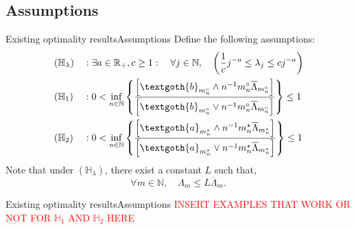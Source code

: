 \documentclass[10pt]{beamer}
\begin{document}
\subsection{Assumptions}
\begin{frame}{Existing optimality results}{Assumptions}
Define the following assumptions:
\begin{alignat*}{2}
&\left(\mathbb{H}_{\lambda}\right) &&: \exists a \in \mathbb{R}_{+}, c \geq 1 : \quad \forall j \in \mathbb{N}, \quad \left(\frac{1}{c} j^{-a} \leq \lambda_{j} \leq c j^{-a}\right)\\
&\left(\mathbb{H}_{1}\right) &&: 0 <\inf\limits_{n \in \mathbb{N}} \left\{\frac{\left[\textgoth{b}_{m_{n}^{\circ}}\wedge n^{-1} m_{n}^{\circ} \overline{\Lambda}_{m_{n}^{\circ}}\right]}{\left[\textgoth{b}_{m_{n}^{\circ}}\vee n^{-1} m_{n}^{\circ} \overline{\Lambda}_{m_{n}^{\circ}}\right]}\right\} \leq 1\\
&\left(\mathbb{H}_{2}\right) &&: 0 <\inf\limits_{n \in \mathbb{N}} \left\{\frac{\left[\textgoth{a}_{m_{n}^{\star}}\wedge n^{-1} m_{n}^{\star} \overline{\Lambda}_{m_{n}^{\star}}\right]}{\left[\textgoth{a}_{m_{n}^{\star}}\vee n^{-1} m_{n}^{\star} \overline{\Lambda}_{m_{n}^{\star}}\right]}\right\} \leq 1\\
\end{alignat*}
Note that under $\left(\mathbb{H}_{\lambda}\right)$, there exist a constant $L$ such that,
\[\forall m \in \mathbb{N}, \quad \Lambda_{m} \leq L \overline{\Lambda}_{m}.\]

\end{frame}

\begin{frame}{Existing optimality results}{Assumptions}
\textcolor{red}{INSERT EXAMPLES THAT WORK OR NOT FOR $\mathbb{H}_{1}$ AND $\mathbb{H}_{2}$ HERE}
\end{frame}
\end{document}
